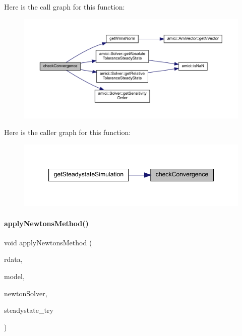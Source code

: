 Here is the call graph for this function\+:
\nopagebreak
\begin{figure}[H]
\begin{center}
\leavevmode
\includegraphics[width=350pt]{classamici_1_1_steadystate_problem_a06f944df556560112e76a23213bf3f51_cgraph}
\end{center}
\end{figure}
Here is the caller graph for this function\+:
\nopagebreak
\begin{figure}[H]
\begin{center}
\leavevmode
\includegraphics[width=347pt]{classamici_1_1_steadystate_problem_a06f944df556560112e76a23213bf3f51_icgraph}
\end{center}
\end{figure}
\mbox{\label{classamici_1_1_steadystate_problem_a7b4c27de74a8185d0b454426601a187e}} 
\paragraph{\texorpdfstring{applyNewtonsMethod()}{applyNewtonsMethod()}}
{\footnotesize\ttfamily void apply\+Newtons\+Method (\begin{DoxyParamCaption}\item[{\mbox{\hyperlink{classamici_1_1_return_data}{Return\+Data}} $\ast$}]{rdata,  }\item[{\mbox{\hyperlink{classamici_1_1_model}{Model}} $\ast$}]{model,  }\item[{\mbox{\hyperlink{classamici_1_1_newton_solver}{Newton\+Solver}} $\ast$}]{newton\+Solver,  }\item[{\mbox{\hyperlink{namespaceamici_a3fb34b6904b8b45827b51132977431da}{Newton\+Status}}}]{steadystate\+\_\+try }\end{DoxyParamCaption})}

